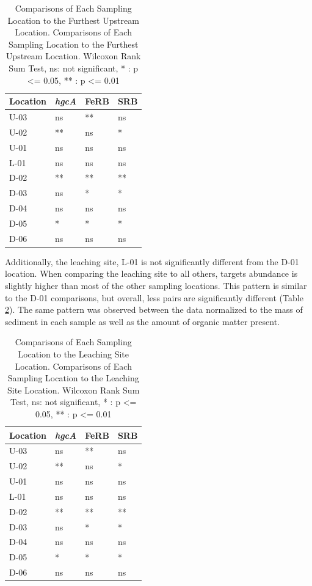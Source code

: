 \documentclass[ms, hidelinks]{uncgdissertationexp3}
\theoremstyle{plain}
\theoremstyle{definition}
\theoremstyle{remark}
\newcommand{\titlecaption}[2]{\caption[#1]{#1. #2}}
\begin{document}
\begin{table}[htbp]
  \centering
  \titlecaption{Comparisons of Each Sampling Location to the Furthest Upstream Location}{Comparisons of Each Sampling Location to the Furthest Upstream Location. Wilcoxon Rank Sum Test, ns: not significant, * : p <= 0.05, ** : p <= 0.01}\label{tab:compareU}
  \begin{tabular}{llll}
  \toprule
  Location & \textit{hgcA} & FeRB & SRB\\
  \midrule
  U-03 & ns & ** & ns\\
  U-02 & ** & ns & *\\
  U-01 & ns & ns & ns\\
  L-01 & ns & ns & ns\\
  D-02 & ** & ** & **\\
  D-03 & ns & * & *\\
  D-04 & ns & ns & ns\\
  D-05 & * & * & *\\
  D-06 & ns & ns & ns\\
  \bottomrule
  \end{tabular}
  \vspace{18pt}
\end{table}

Additionally, the leaching site, L-01 is not significantly different from the D-01 location. When comparing the leaching site to all others, targets abundance is slightly higher than most of the other sampling locations. This pattern is similar to the D-01 comparisons, but overall, less pairs are significantly different (Table \ref{tab:compareL}). The same pattern was observed between the data normalized to the mass of sediment in each sample as well as the amount of organic matter present.

\begin{table}[htbp]
  \centering
  \titlecaption{Comparisons of Each Sampling Location to the Leaching Site Location}{Comparisons of Each Sampling Location to the Leaching Site Location. Wilcoxon Rank Sum Test, ns: not significant, * : p <= 0.05, ** : p <= 0.01}\label{tab:compareL}
  \begin{tabular}{llll}
  \toprule
  Location & \textit{hgcA} & FeRB & SRB\\
  \midrule
U-03 & ns & ** & ns\\
U-02 & ** & ns & *\\
U-01 & ns & ns & ns\\
L-01 & ns & ns & ns\\
D-02 & ** & ** & **\\
D-03 & ns & * & *\\
D-04 & ns & ns & ns\\
D-05 & * & * & *\\
D-06 & ns & ns & ns\\
  \bottomrule
  \end{tabular}
  \vspace{18pt}
\end{table}
\end{document}
